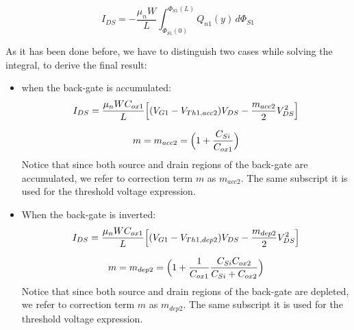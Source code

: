 \documentclass[a4paper, 12pt, twoside, openright]{report}
\begin{document}
	\begin{equation}
	I_{DS} = - \frac{\mu_n W}{L}\int_{\Phi_{S1}(0)}^{\Phi_{S1}(L)}Q_{n1}(y)\,d\Phi_{S1}
	\end{equation}

 As it has been done before, we have to distinguish two cases while solving the integral, to derive the final result:

\begin{itemize}
\item when the back-gate is accumulated:
	\begin{equation}
	I_{DS} = \frac{\mu_n W C_{ox1}}{L}\Bigl[(V_{G1} - V_{Th1,acc2})V_{DS} - \frac{m_{acc2}}{2}V_{DS}^2\Bigr]
	\end{equation}

	\begin{equation}
	m = m_{acc2} = \Bigl(1 + \frac{C_{Si}}{C_{ox1}}\Bigr)
	\end{equation}
Notice that since both source and drain regions of the back-gate are accumulated, we refer to correction term $m$ as $m_{acc2}$. The same subscript it is used for the threshold voltage expression.

\item When the back-gate is inverted:
	\begin{equation}
	I_{DS} = \frac{\mu_n W C_{ox1}}{L}\Bigl[(V_{G1} - V_{Th1,dep2})V_{DS} - \frac{m_{dep2}}{2}V_{DS}^2\Bigr]
	\end{equation}

	\begin{equation}
	m = m_{dep2} = \Bigl(1 + \frac{1}{C_{ox1}}\frac{C_{Si} C_{ox2}}{C_{Si} + C_{ox2}}\Bigr)
	\end{equation}
Notice that since both source and drain regions of the back-gate are depleted, we refer to correction term $m$ as $m_{dep2}$. The same subscript it is used for the threshold voltage expression.

\end{itemize}



\end{document}
